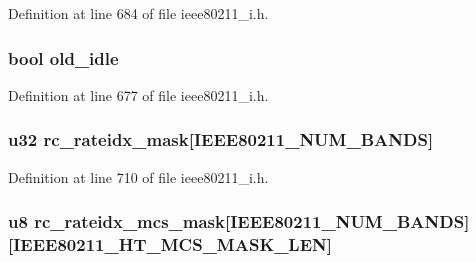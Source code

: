 Definition at line 684 of file ieee80211\-\_\-i.\-h.

\hypertarget{structieee80211__sub__if__data_a3bf326db8dc3ffdc0338743371dfc65b}{
\subsubsection[{old\-\_\-idle}]{\setlength{\rightskip}{0pt plus 5cm}bool old\-\_\-idle}}\label{structieee80211__sub__if__data_a3bf326db8dc3ffdc0338743371dfc65b}


Definition at line 677 of file ieee80211\-\_\-i.\-h.

\hypertarget{structieee80211__sub__if__data_a4291130d4a0d651a69780340ad638ce2}{
\subsubsection[{rc\-\_\-rateidx\-\_\-mask}]{\setlength{\rightskip}{0pt plus 5cm}u32 rc\-\_\-rateidx\-\_\-mask\mbox{[}I\-E\-E\-E80211\-\_\-\-N\-U\-M\-\_\-\-B\-A\-N\-D\-S\mbox{]}}}\label{structieee80211__sub__if__data_a4291130d4a0d651a69780340ad638ce2}


Definition at line 710 of file ieee80211\-\_\-i.\-h.

\hypertarget{structieee80211__sub__if__data_af3f2e32024ff5987cf20338a95ecc35f}{
\subsubsection[{rc\-\_\-rateidx\-\_\-mcs\-\_\-mask}]{\setlength{\rightskip}{0pt plus 5cm}u8 rc\-\_\-rateidx\-\_\-mcs\-\_\-mask\mbox{[}I\-E\-E\-E80211\-\_\-\-N\-U\-M\-\_\-\-B\-A\-N\-D\-S\mbox{]}\mbox{[}I\-E\-E\-E80211\-\_\-\-H\-T\-\_\-\-M\-C\-S\-\_\-\-M\-A\-S\-K\-\_\-\-L\-E\-N\mbox{]}}}\label{structieee80211__sub__if__data_af3f2e32024ff5987cf20338a95ecc35f}



